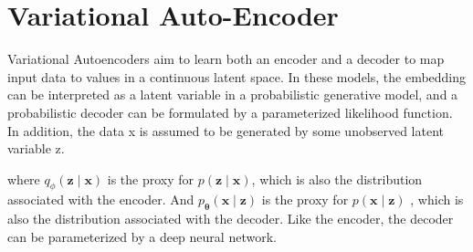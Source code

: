 \section{Variational Auto-Encoder}
Variational Autoencoders aim to learn both an encoder and a decoder to map input data to values in  a continuous latent space.
In these models, the embedding can be interpreted as a latent variable in a probabilistic  generative model, and a probabilistic decoder can be formulated by a parameterized likelihood function. In addition,  the data x is assumed to be generated by some unobserved latent variable z.

where $q_{\phi}(\mathbf{z} \mid \mathbf{x})$ is the proxy for  $p(\mathbf{z} \mid \mathbf{x})$, which is also the distribution associated with the encoder.  
And $p_{\boldsymbol{\theta}}(\mathbf{x} \mid \mathbf{z})$ is the proxy for  $p(\mathbf{x} \mid \mathbf{z})$ , which is also the distribution associated with the decoder. 
Like the encoder, the decoder can be parameterized by a deep neural network. 

